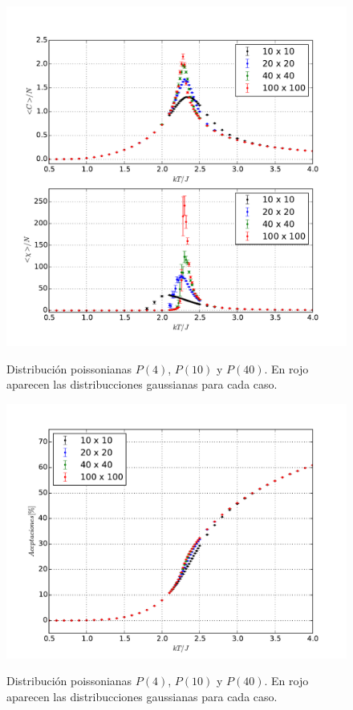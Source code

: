 \documentclass[a4paper,12pt]{article}
\begin{document}
\begin{figure}[H]
    \begin{center}
      \includegraphics[scale=0.6]{tamano_fluctuaciones.pdf} \\
      \caption{Distribución poissonianas $P(4)$, $P(10)$ y $P(40)$. En rojo 
      aparecen las distribucciones gaussianas para cada 
      caso.}\label{fig:fluctuaciones}
    \end{center}
\end{figure}

\begin{figure}[H]
    \begin{center}
      \includegraphics[scale=0.5]{tamano_aceptaciones.pdf} \\
      \caption{Distribución poissonianas $P(4)$, $P(10)$ y $P(40)$. En rojo 
      aparecen las distribucciones gaussianas para cada 
      caso.}\label{fig:aceptaciones}
    \end{center}
\end{figure}
\end{document}
